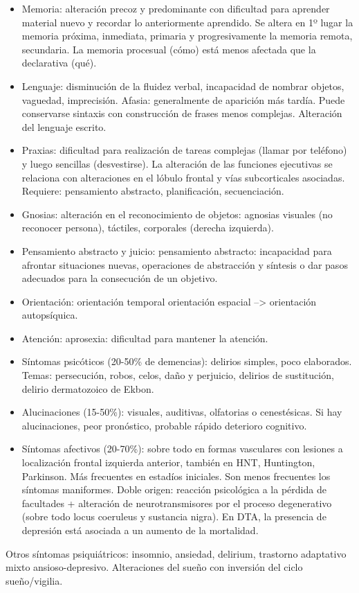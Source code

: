 \begin{itemize}
\item Memoria: alteración precoz y predominante con dificultad para aprender material nuevo y recordar lo anteriormente aprendido. Se altera en 1º lugar la memoria próxima, inmediata, primaria y progresivamente la memoria remota, secundaria. La memoria procesual (cómo) está menos afectada que la declarativa (qué).
\item Lenguaje: disminución de la fluidez verbal, incapacidad de nombrar objetos, vaguedad, imprecisión. Afasia: generalmente de aparición más tardía. Puede conservarse sintaxis con construcción de frases menos complejas. Alteración del lenguaje escrito.
\item Praxias: dificultad para realización de tareas complejas (llamar por teléfono) y luego sencillas (desvestirse). La alteración de las funciones ejecutivas se relaciona con alteraciones en el lóbulo frontal y vías subcorticales asociadas. Requiere: pensamiento abstracto, planificación, secuenciación.
\item Gnosias: alteración en el reconocimiento de objetos: agnosias visuales (no reconocer persona), táctiles, corporales (derecha izquierda).
\item Pensamiento abstracto y juicio: pensamiento abstracto: incapacidad para afrontar situaciones nuevas, operaciones de abstracción y síntesis o dar pasos adecuados para la consecución de un objetivo.
\item Orientación: orientación temporal orientación espacial –> orientación autopsíquica.
\item Atención: aprosexia: dificultad para mantener la atención.
\item Síntomas psicóticos (20-50\% de demencias): delirios simples, poco elaborados. Temas: persecución, robos, celos, daño y perjuicio, delirios de sustitución, delirio dermatozoico de Ekbon.
\item Alucinaciones (15-50\%): visuales, auditivas, olfatorias o cenestésicas. Si hay alucinaciones, peor pronóstico, probable rápido deterioro cognitivo.
\item Síntomas afectivos (20-70\%): sobre todo en formas vasculares con lesiones a localización frontal izquierda anterior, también en HNT, Huntington, Parkinson. Más frecuentes en estadíos iniciales. Son menos frecuentes los síntomas maniformes. Doble origen: reacción psicológica a la pérdida de facultades + alteración de neurotransmisores por el proceso degenerativo (sobre todo locus coeruleus y sustancia nigra). En DTA, la presencia de depresión está asociada a un aumento de la mortalidad.
\end{itemize}
Otros síntomas psiquiátricos: insomnio, ansiedad, delirium, trastorno adaptativo mixto ansioso-depresivo. Alteraciones del sueño con inversión del ciclo sueño/vigilia.

